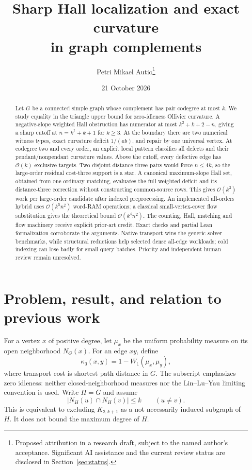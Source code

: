 \documentclass[11pt]{article}
\title{Sharp Hall localization and exact curvature\protect\\in graph complements}
\author{Petri Mikael Autio\thanks{Proposed attribution in a research draft, subject to the named author's acceptance. Significant AI assistance and the current review status are disclosed in Section~\ref{sec:status}.}}
\date{21 October 2026}
\theoremstyle{remark}
\newcommand{\Oh}{\mathcal O}
\newcommand{\NH}{N_H}
\newcommand{\NGraph}{N_G}
\begin{document}
\maketitle

\begin{abstract}
Let $G$ be a connected simple graph whose complement has pair codegree at most $k$. We study equality in the triangle upper bound for zero-idleness Ollivier curvature. A negative-slope weighted Hall obstruction has numerator at most $k^2+k+2-n$, giving a sharp cutoff at $n=k^2+k+1$ for $k\ge3$. At the boundary there are two numerical witness types, exact curvature deficit $1/(ab)$, and repair by one universal vertex. At codegree two and every order, an explicit local pattern classifies all defects and their pendant/nonpendant curvature values. Above the cutoff, every defective edge has $\Oh(k)$ exclusive targets. Two disjoint distance-three pairs would force $n\le4k$, so the large-order residual cost-three support is a star. A canonical maximum-slope Hall set, obtained from one ordinary matching, evaluates the full weighted deficit and its distance-three correction without constructing common-source rows. This gives $\Oh(k^3)$ work per large-order candidate after indexed preprocessing. An implemented all-orders hybrid uses $\Oh(k^5n^2)$ word-RAM operations; a classical small-vertex-cover flow substitution gives the theoretical bound $\Oh(k^4n^2)$. The counting, Hall, matching and flow machinery receive explicit prior-art credit. Exact checks and partial Lean formalization corroborate the arguments. Native transport wins the generic solver benchmarks, while structural reductions help selected dense all-edge workloads; cold indexing can lose badly for small query batches. Priority and independent human review remain unresolved.
\end{abstract}

\section{Problem, result, and relation to previous work}

For a vertex $x$ of positive degree, let $\mu_x$ be the uniform probability measure on its open neighborhood $\NGraph(x)$. For an edge $xy$, define
\[
 \kappa_0(x,y)=1-W_1(\mu_x,\mu_y),
\]
where transport cost is shortest-path distance in $G$. The subscript emphasizes zero idleness: neither closed-neighborhood measures nor the Lin--Lu--Yau limiting convention is used. Write $H=\overline G$ and assume
\begin{equation}\label{eq:codegree}
 |\NH(u)\cap\NH(v)|\le k\qquad(u\ne v).
\end{equation}
This is equivalent to excluding $K_{2,k+1}$ as a not necessarily induced subgraph of $H$. It does not bound the maximum degree of $H$.
\end{document}
